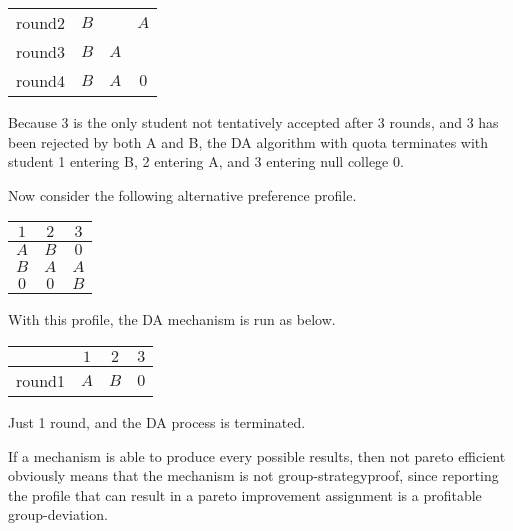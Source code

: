 \begin{example}
\begin{center}
\begin{tabular}{|c|c|c|c|}
        round2&$B$ &  & $A$ \\

        round3&$B$ & $A$  & \\

        round4&$B$ & $A$ & $0$\\
        \hline
        
      \end{tabular}
    \end{center}

Because 3 is the only student not tentatively accepted after 3 rounds,
and 3 has been rejected by both A and B, the DA algorithm with quota
terminates with student 1 entering B, 2 entering A, and 3 entering null college $0$.

Now consider the following alternative preference profile.
\begin{center}
  \begin{tabular}{|c|c|c|}
    \hline
    $1$ & $2$ & $3$ \\
    \hline
    $A$ & $B$ & $0$ \\
    
    $B$ & $A$ & $A$ \\

    $0$ & $0$ & $B$ \\

    \hline
    
  \end{tabular}
\end{center}

With this profile, the DA mechanism is run as below.

\begin{center}
  \begin{tabular}{|c|c|c|c|}
    \hline
    &$1$ & $2$ & $3$\\
    \hline
    round1& $A$  & $B$ & $0$ \\
    
    \hline
    
  \end{tabular}
\end{center}

Just 1 round, and the DA process is terminated.





\end{example} 

 If a mechanism is able to produce every possible results, then not pareto efficient obviously means that the mechanism is not group-strategyproof, since reporting the profile that can result in a pareto improvement assignment is a profitable group-deviation.



